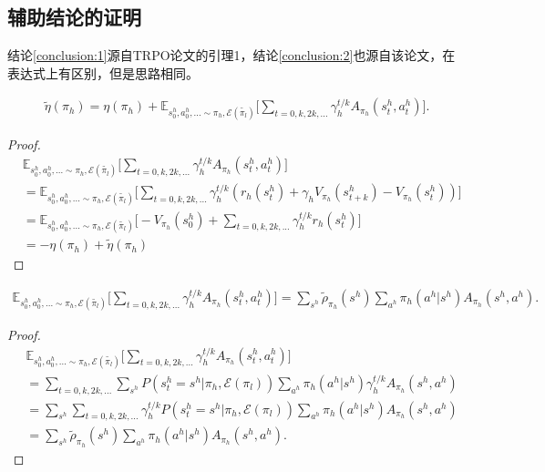 \subsection{辅助结论的证明}
\label{sec:additional_proof}
结论\ref{conclusion:1}源自TRPO论文的引理1\cite{TRPO}，结论\ref{conclusion:2}也源自该论文，在表达式上有区别，但是思路相同。
\newtheorem{conclusion}{结论} %

\begin{lemma}
\label{conclusion:1}
\begin{align}
  \tilde{\eta}(\pi_h) = \eta(\pi_h) + \mathbb{E}_{s_0^h, a_0^h, ... \sim \pi_h, \mathcal{E}(\tilde{\pi_l})}\Bigg[\sum_{t=0,k,2k,...} \gamma_h^{t/k} A_{\pi_h}(s_t^h, a_t^h)\Bigg].
\end{align}
\end{lemma}

\begin{proof}
\begin{align}
  &\mathbb{E}_{s_0^h, a_0^h, ... \sim \pi_h, \mathcal{E}(\tilde{\pi_l})}\Bigg[\sum_{t=0,k,2k,...} \gamma_h^{t/k} A_{\pi_h}(s_t^h, a_t^h)\Bigg]\\
  &= \mathbb{E}_{s_0^h, a_0^h, ... \sim \pi_h, \mathcal{E}(\tilde{\pi_l})}\Bigg[
      \sum_{t = 0, k, 2k, ...}\gamma_h^{t/k}(r_h(s_t^h)+\gamma_h V_{\pi_h}(s_{t+k}^h) - V_{\pi_h}(s_t^h))
      \Bigg]\\
  &= \mathbb{E}_{s_0^h, a_0^h, ... \sim \pi_h, \mathcal{E}(\tilde{\pi_l})}\Bigg[
      -V_{\pi_h}(s_0^h) + \sum_{t=0,k,2k,...} \gamma_h^{t/k} r_h(s_t^h)
      \Bigg]\\
  &= -\eta(\pi_h) + \tilde{\eta}(\pi_h)
\end{align}
\end{proof}

\begin{lemma}
\label{conclusion:2}
\begin{align}
    \mathbb{E}_{s_0^h, a_0^h, ... \sim \pi_h, \mathcal{E}(\tilde{\pi_l})}\Bigg[\sum_{t=0,k,2k,...} \gamma_h^{t/k} A_{\pi_h}(s_t^h, a_t^h)\Bigg] = \sum_{s^h}\tilde{\rho}_{\pi_h}(s^h)\sum_{a^h}\pi_h(a^h|s^h)A_{\pi_h}(s^h,a^h).
\end{align}
\end{lemma}

\begin{proof}
\label{proof:lemma2}
\begin{align}
  &\mathbb{E}_{s_0^h, a_0^h, ... \sim \pi_h, \mathcal{E}(\tilde{\pi_l})}\Bigg[\sum_{t=0,k,2k,...} \gamma_h^{t/k} A_{\pi_h}(s_t^h, a_t^h)\Bigg]\\
  &= \sum_{t = 0,k,2k,...} \sum_{s^h} P(s_t^h = s^h| \pi_h, \mathcal{E}(\pi_l)) \sum_{a^h} \pi_h(a^h|s^h) \gamma_h^{t/k} A_{\pi_h}(s^h, a^h)\\
  &= \sum_{s^h} \sum_{t = 0,k,2k,...} \gamma_h^{t/k} P(s_t^h = s^h|\pi_h, \mathcal{E}(\pi_l)) \sum_{a^h}\pi_h(a^h|s^h)A_{\pi_h}(s^h,a^h)\\
  &= \sum_{s^h}\tilde{\rho}_{\pi_h}(s^h)\sum_{a^h}\pi_h(a^h|s^h)A_{\pi_h}(s^h,a^h).
\end{align}
\end{proof}


